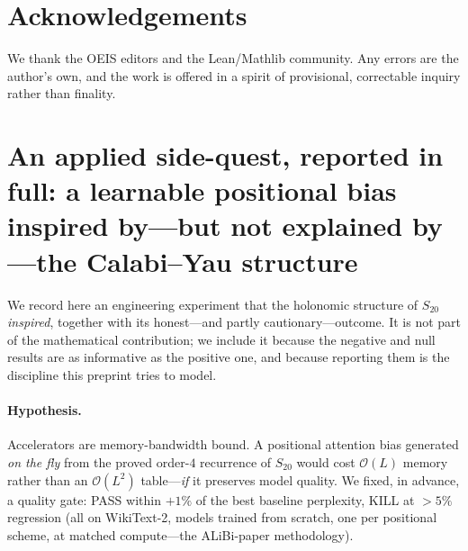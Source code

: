 \documentclass[11pt,a4paper]{article}
\theoremstyle{definition}
\theoremstyle{remark}
\newcommand{\Sx}{S_{20}}
\begin{document}
\section*{Acknowledgements}
We thank the OEIS editors and the Lean/Mathlib community.  Any errors are the
author's own, and the work is offered in a spirit of provisional, correctable
inquiry rather than finality.

\appendix
\section{An applied side-quest, reported in full: a learnable positional
bias inspired by---but not explained by---the Calabi--Yau structure}
\label{app:attention}

We record here an engineering experiment that the holonomic structure of $\Sx$
\emph{inspired}, together with its honest---and partly cautionary---outcome. It
is not part of the mathematical contribution; we include it because the negative
and null results are as informative as the positive one, and because reporting
them is the discipline this preprint tries to model.

\paragraph{Hypothesis.} Accelerators are memory-bandwidth bound. A positional
attention bias generated \emph{on the fly} from the proved order-$4$ recurrence
of $\Sx$ would cost $\mathcal{O}(L)$ memory rather than an $\mathcal{O}(L^2)$
table---\emph{if} it preserves model quality. We fixed, in advance, a quality
gate: PASS within $+1\%$ of the best baseline perplexity, KILL at $>5\%$
regression (all on WikiText-2, models trained from scratch, one per positional
scheme, at matched compute---the ALiBi-paper methodology).
\end{document}
